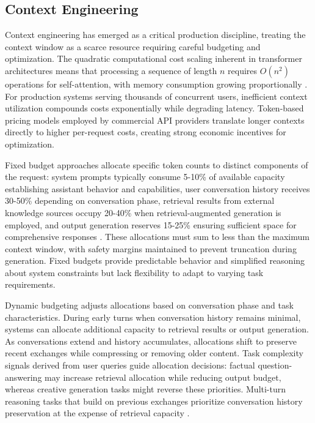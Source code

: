 \subsection{Context Engineering}

Context engineering has emerged as a critical production discipline, treating the context window as a scarce resource requiring careful budgeting and optimization. The quadratic computational cost scaling inherent in transformer architectures means that processing a sequence of length $n$ requires $O(n^2)$ operations for self-attention, with memory consumption growing proportionally \citep{vaswani2017attention}. For production systems serving thousands of concurrent users, inefficient context utilization compounds costs exponentially while degrading latency. Token-based pricing models employed by commercial API providers translate longer contexts directly to higher per-request costs, creating strong economic incentives for optimization.

Fixed budget approaches allocate specific token counts to distinct components of the request: system prompts typically consume 5-10\% of available capacity establishing assistant behavior and capabilities, user conversation history receives 30-50\% depending on conversation phase, retrieval results from external knowledge sources occupy 20-40\% when retrieval-augmented generation is employed, and output generation reserves 15-25\% ensuring sufficient space for comprehensive responses \citep{factory2024budgeting}. These allocations must sum to less than the maximum context window, with safety margins maintained to prevent truncation during generation. Fixed budgets provide predictable behavior and simplified reasoning about system constraints but lack flexibility to adapt to varying task requirements.

Dynamic budgeting adjusts allocations based on conversation phase and task characteristics. During early turns when conversation history remains minimal, systems can allocate additional capacity to retrieval results or output generation. As conversations extend and history accumulates, allocations shift to preserve recent exchanges while compressing or removing older content. Task complexity signals derived from user queries guide allocation decisions: factual question-answering may increase retrieval allocation while reducing output budget, whereas creative generation tasks might reverse these priorities. Multi-turn reasoning tasks that build on previous exchanges prioritize conversation history preservation at the expense of retrieval capacity \citep{kim2024budget}.

